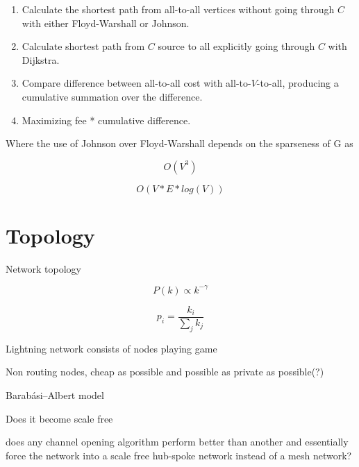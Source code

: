 \begin{enumerate}
	\item Calculate the shortest path from all-to-all vertices without going through $C$ with either Floyd-Warshall or Johnson. 
	\item Calculate shortest path from $C$ source to all explicitly going through $C$ with Dijkstra.
	\item Compare difference between all-to-all cost with all-to-$V$-to-all, producing a cumulative summation over the difference.
	\item Maximizing fee * cumulative difference.
\end{enumerate} 


Where the use of Johnson over Floyd-Warshall depends on the sparseness of G as

\[ O(V^3) \]

\[ O(V*E*log(V)) \]
\section{Topology}

Network topology

\[ P(k) \propto k^{-\gamma} \]

\[ p_i = \dfrac{k_i}{\sum_{j}^{}k_j}  \]


Lightning network consists of nodes playing game

Non routing nodes, cheap as possible and possible as private as possible(?) 

Barabási–Albert model

Does it become scale free

does any channel opening algorithm perform better than another and essentially force the network into a scale free hub-spoke network instead of a mesh network?
 



\newpage
\onecolumn


